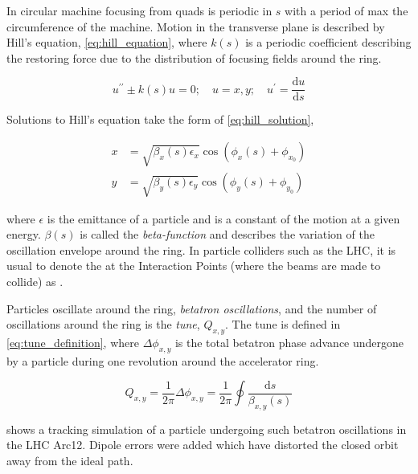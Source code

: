 In circular machine focusing from quads is periodic in $s$ with a period of max the circumference of the machine.
Motion in the transverse plane is described by Hill’s equation, \cref{eq:hill_equation}, where $k(s)$ is a periodic coefficient describing the restoring force due to the distribution of focusing fields around the ring.
\bigbreak

\begin{equation}
    u^{\prime \prime} \pm k(s) u = 0; \quad u = x, y; \quad u^{\prime} = \frac{\mathrm{d}u}{\mathrm{d}s}
    \label{eq:hill_equation}
\end{equation}
\bigbreak

Solutions to Hill’s equation take the form of \cref{eq:hill_solution},
\bigbreak

\begin{equation}
    \begin{aligned}
    x &= \sqrt{\beta_{x}(s) \epsilon_{x}} \cos \left(\phi_{x}(s) + \phi_{x_0}\right) \\
    y &= \sqrt{\beta_{y}(s) \epsilon_{y}} \cos \left(\phi_{y}(s) + \phi_{y_0}\right)
    \end{aligned}
    \label{eq:hill_solution}
\end{equation}

where $\epsilon$ is the emittance of a particle and is a constant of the motion at a given energy.
$\beta(s)$ is called the \emph{beta-function} and describes the variation of the oscillation envelope around the ring. 
In particle colliders such as the LHC, it is usual to denote the \betafunctions at the Interaction Points (where the beams are made to collide) as \betastar.
\bigbreak

Particles oscillate around the ring, \emph{betatron oscillations}, and the number of oscillations around the ring is the \emph{tune}, $Q_{x,y}$.
The tune is defined in \cref{eq:tune_definition}, where $\Delta \phi_{x, y}$ is the total betatron phase advance undergone by a particle during one revolution around the accelerator ring.
\bigbreak

\begin{equation}
    Q_{x, y} = \frac{1}{2 \pi} \Delta \phi_{x, y} = \frac{1}{2 \pi} \oint \frac{\mathrm{d}s}{\beta_{x, y}(s)}
    \label{eq:tune_definition}
\end{equation}

 shows a tracking simulation of a particle undergoing such betatron oscillations in the LHC Arc12.
Dipole errors were added which have distorted the closed orbit away from the ideal path.
\bigbreak

